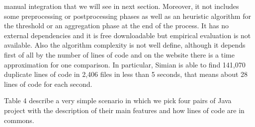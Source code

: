 manual integration that we will see in next section. Moreover, it not includes 
some preprocessing or postprocessing phases as well as an heuristic algorithm 
for the threshold or an aggregation phase at the end of the process. It has no 
external dependencies and it is free downloadable but empirical evaluation is 
not available. Also the algorithm complexity is not well define, although it 
depends first of all by the number of lines of code and on the website there is 
a time approximation for one comparison. In particular, Simian is able to find 
141,070 duplicate lines of code in 2,406 files in less than 5 seconds, that 
means about 28 lines of code for each second. 



Table 4 describe a very simple scenario in which we pick four pairs of Java 
project with the description of their main features and how lines of code are 
in commons.

